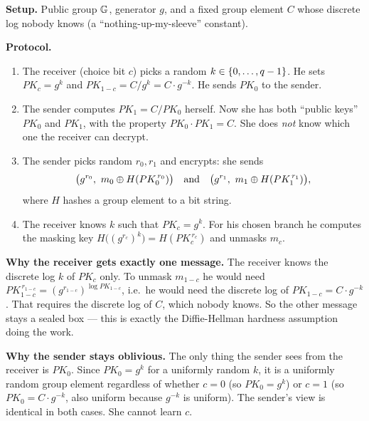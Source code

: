 \textbf{Setup.} Public group $\mathbb{G}$, generator $g$, and a fixed group element $C$ whose discrete log nobody knows (a ``nothing-up-my-sleeve'' constant).

\textbf{Protocol.}
\begin{enumerate}
  \item The receiver (choice bit $c$) picks a random $k \in \{0,\dots,q-1\}$. He sets $PK_c = g^k$ and $PK_{1-c} = C / g^k = C \cdot g^{-k}$. He sends $PK_0$ to the sender.
  \item The sender computes $PK_1 = C / PK_0$ herself. Now she has both ``public keys'' $PK_0$ and $PK_1$, with the property $PK_0 \cdot PK_1 = C$. She does \emph{not} know which one the receiver can decrypt.
  \item The sender picks random $r_0, r_1$ and encrypts: she sends
  \[
    \big(g^{r_0},\ m_0 \oplus H(PK_0^{\,r_0})\big) \quad\text{and}\quad \big(g^{r_1},\ m_1 \oplus H(PK_1^{\,r_1})\big),
  \]
  where $H$ hashes a group element to a bit string.
  \item The receiver knows $k$ such that $PK_c = g^k$. For his chosen branch he computes the masking key $H\big((g^{r_c})^{k}\big) = H(PK_c^{\,r_c})$ and unmasks $m_c$.
\end{enumerate}

\begin{whybox}
\textbf{Why the receiver gets exactly one message.} The receiver knows the discrete log $k$ of $PK_c$ only. To unmask $m_{1-c}$ he would need $PK_{1-c}^{\,r_{1-c}} = (g^{r_{1-c}})^{\log PK_{1-c}}$, i.e.\ he would need the discrete log of $PK_{1-c} = C \cdot g^{-k}$. That requires the discrete log of $C$, which nobody knows. So the other message stays a sealed box --- this is exactly the Diffie-Hellman hardness assumption doing the work.

\textbf{Why the sender stays oblivious.} The only thing the sender sees from the receiver is $PK_0$. Since $PK_0 = g^k$ for a uniformly random $k$, it is a uniformly random group element regardless of whether $c = 0$ (so $PK_0 = g^k$) or $c = 1$ (so $PK_0 = C \cdot g^{-k}$, also uniform because $g^{-k}$ is uniform). The sender's view is identical in both cases. She cannot learn $c$.
\end{whybox}

